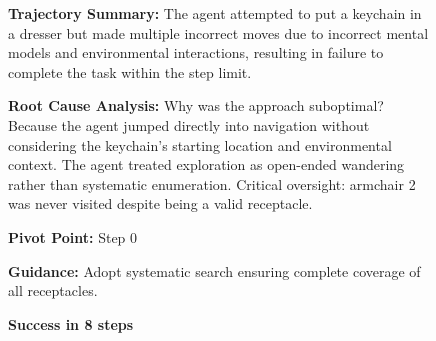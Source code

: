 \begin{figure}[thb]
\begin{tcolorbox}[
    colback=white,
    colframe=black!70,
    title=\textbf{ALFWorld: Put a keychain in dresser},
    fonttitle=\bfseries\small,
    width=\textwidth,
    boxrule=0.5pt
]
\end{tcolorbox}

\vspace{0.5em}

\begin{tcolorbox}[
    colback=gray!8,
    colframe=black!70,
    title=\textbf{Reflection Output},
    fonttitle=\bfseries\small,
    width=\textwidth,
    boxrule=0.5pt
]
\footnotesize

\textbf{Trajectory Summary:} The agent attempted to put a keychain in a dresser but made multiple incorrect moves due to incorrect mental models and environmental interactions, resulting in failure to complete the task within the step limit.

\vspace{0.5em}
\textbf{Root Cause Analysis:} Why was the approach suboptimal? Because the agent jumped directly into navigation without considering the keychain's starting location and environmental context. The agent treated exploration as open-ended wandering rather than systematic enumeration. Critical oversight: armchair 2 was never visited despite being a valid receptacle.

\vspace{0.5em}
\textbf{Pivot Point:} Step 0 

\vspace{0.5em}
\textbf{Guidance:} Adopt systematic search ensuring complete coverage of all receptacles.

\end{tcolorbox}

\vspace{0.5em}

\begin{tcolorbox}[
    colback=white,
    colframe=black!70,
    title=\textbf{Retry Trajectory (guidance removed for training)},
    fonttitle=\bfseries\small,
    width=\textwidth,
    boxrule=0.5pt
]

\hfill \textcolor{green!50!black}{\textbf{Success in 8 steps}}


\end{tcolorbox}
\end{figure}

